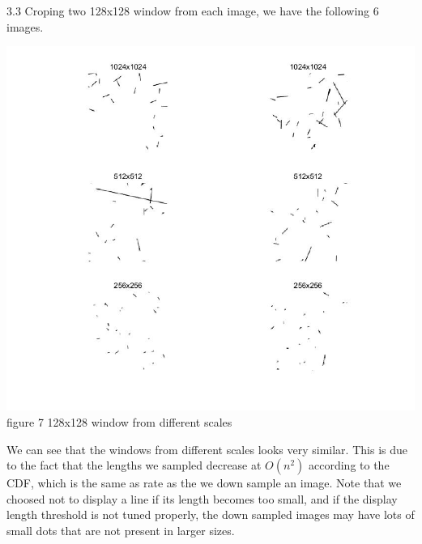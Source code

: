 \documentclass[12pt]{article}
\newenvironment{problem}[2][Problem]{\begin{trivlist}
\item[\hskip \labelsep {\bfseries #1}\hskip \labelsep {\bfseries #2}]}{\end{trivlist}}
\begin{document}
\begin{problem}{3. A 2D Scale Invariant World}
\begin{center}
\end{center}
\item{3.3}
Croping two 128x128 window from each image, we have the following 6 images.
\begin{center}
		\includegraphics[width=18cm]{results/q4.jpg}{\\figure 7 128x128 window from different scales}
\end{center}
We can see that the windows from different scales looks very similar. This is due to the fact that the lengths we sampled decrease at $O(n^2)$ according to the CDF, which is the same as rate as the we down sample an image. Note that we choosed not to display a line if its length becomes too small, and if the display length threshold is not tuned properly, the down sampled images may have lots of small dots that are not present in larger sizes.

\end{problem}

 
\end{document}
